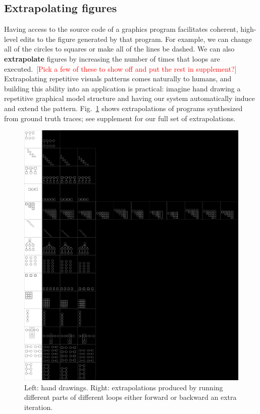 \documentclass{article}
\newcommand{\remark}[1]{\textcolor{red}{[#1]}}
\begin{document}
\subsection{Extrapolating figures}
Having access to the source code of a graphics program facilitates coherent, high-level edits to the figure generated by that program. 
For example,
we can change all of the circles to squares or make all of the lines be dashed.
We can also \textbf{extrapolate} figures
by increasing the number of times that loops are executed.~\remark{Pick a few of these to show off and put the rest in supplement?}
Extrapolating repetitive visuals patterns comes naturally to humans,
and building this ability into an application is practical:
imagine hand drawing a repetitive graphical model structure
and having our system automatically induce and extend the pattern.
Fig.~\ref{extrapolationFigure} shows extrapolations of programs synthesized from ground truth traces;
see supplement for our full set of extrapolations.

\begin{figure}
  \includegraphics[width = 8in]{figures/extrapolationMatrix.png}
  \caption{Left: hand drawings. Right: extrapolations produced by
    running different parts of different loops either forward or
    backward an extra iteration.}\label{extrapolationFigure}
  \end{figure}
%
\end{document}
